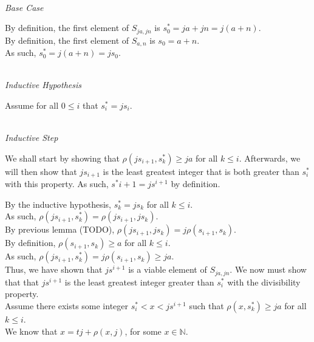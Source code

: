 \documentclass[a4paper,12pt]{article}
\begin{document}
\noindent \\
\textit{Base Case}

\noindent By definition, the first element of $S_{ja, jn}$ is $s^*_0 = ja + jn = j(a + n)$.\\

\noindent By definition, the first element of $S_{a,n}$ is $s_0 = a + n$.\\

\noindent As such, $s^*_0 = j(a + n) = js_0$.



\noindent \\
\textit{Inductive Hypothesis}

\noindent Assume for all $0 \leq i$ that $s^*_i = js_i$.


\noindent \\
\textit{Inductive Step}

\noindent We shall start by showing that $\rho(js_{i+1}, s^*_k) \geq ja$ for all $k \leq i$. Afterwards, we will then show that $js_{i+1}$ is the least greatest integer that is both greater than $s^*_i$ with this property. As such, $s^*{i+1} = js^{i+1}$ by definition.

\noindent By the inductive hypothesis, $s^*_k = js_k$ for all $k \leq i$.\\

\noindent As such, $\rho(js_{i+1}, s^*_k) = \rho(js_{i+1}, js_k)$.\\

\noindent By previous lemma (TODO), $\rho(js_{i+1}, js_k) = j \rho(s_{i+1}, s_k)$.\\

\noindent By definition, $\rho(s_{i+1}, s_k) \geq a$ for all $k \leq i$.\\

\noindent As such, $\rho(js_{i+1}, s^*_k) = j \rho(s_{i+1}, s_k) \geq ja$.\\

\noindent Thus, we have shown that $js^{i+1}$ is a viable element of $S_{ja, jn}$. We now must show that that $js^{i+1}$ is the least greatest integer greater than $s^*_i$ with the divisibility property.\\

\noindent Assume there exists some integer $s^*_i < x < js^{i+1}$ such that $\rho(x, s^*_k) \geq ja$ for all $k \leq i$.\\

\noindent We know that $x = tj + \rho(x, j)$, for some $x \in \mathbb{N}$.
\end{document}

